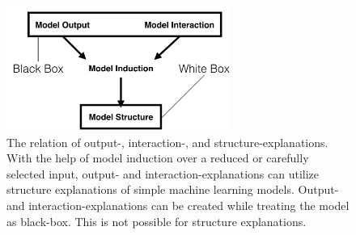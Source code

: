 \begin{figure}
\centering
\includegraphics[height=11em]{figs/motivation/expl_classes}
\caption{
The relation of output-, interaction-, and structure-explanations.
With the help of model induction over a reduced or carefully selected
input, output- and interaction-explanations can utilize structure explanations
of simple machine learning models.
Output- and interaction-explanations can be created while treating the model
as black-box. This is not possible for structure explanations.
}
\label{figs:motivation_expl_classes}
\end{figure}